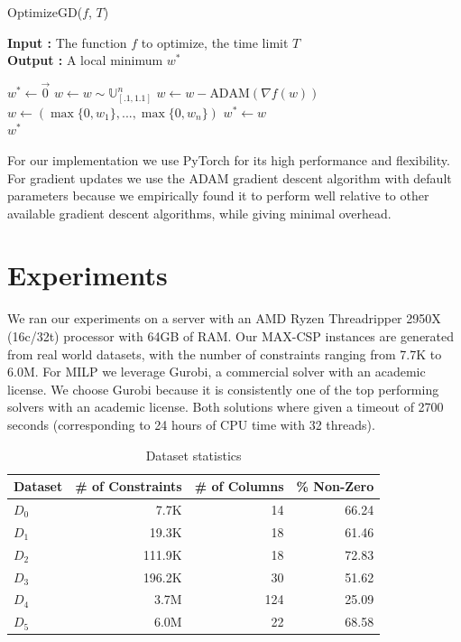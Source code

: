 \documentclass[a4paper]{article}
\begin{document}
\begin{algorithm}[H]
\caption{OptimizeGD($f$, $T$)}
\textbf{Input : } The function $f$ to optimize, the time limit $T$\\
\textbf{Output : } A local minimum $w^*$
\begin{algorithmic}[1]
	\State $w^* \gets \overrightarrow{0}$ 
		\State $w \gets w \sim \mathds{U}_{[.1,1.1]}^n$ 
				\State $w \gets w - \text{ADAM}(\nabla f(w))$ 
				\State $w \gets (\max\{0, w_1\},..., \max\{0, w_n\})$ 
			\EndFor
				\State $w^* \gets w$ 
			\EndIf
		\EndFor
	\EndWhile
	\\\Return $w^*$
\end{algorithmic}
\end{algorithm}

For our implementation we use PyTorch \cite{pytorch} for its high performance
and flexibility. For gradient updates we use the ADAM gradient descent algorithm with default parameters
\cite{ADAM_paper} because we empirically found it to perform well relative to
other available gradient descent algorithms, while giving minimal overhead. 

\section{Experiments}

We ran our experiments on a server with an AMD Ryzen Threadripper 2950X
(16c/32t) processor with 64GB of RAM. Our MAX-CSP instances are generated from
real world datasets, with the number of constraints ranging from 7.7K to 6.0M.
For MILP we leverage Gurobi, a commercial solver with an
academic license. We choose Gurobi because it is consistently one of the top
performing solvers \cite{benchmark} with an academic license. Both solutions where given a
timeout of 2700 seconds (corresponding to 24 hours of CPU time with 32 threads).

\begin{table}[ht!]
\caption{Dataset statistics}
\begin{tabular}{|l|r|r|r|}
\toprule
Dataset &  \# of Constraints &  \# of Columns &  \% Non-Zero \\
\midrule
         $D_0$ &                   7.7K &                 14 &         66.24 \\
         $D_1$ &                  19.3K &                 18 &         61.46 \\
         $D_2$ &                 111.9K &                 18 &         72.83 \\
         $D_3$ &                 196.2K &                 30 &         51.62 \\
         $D_4$ &                3.7M    &                124 &         25.09 \\
         $D_5$ &                6.0M    &                 22 &         68.58 \\
\bottomrule
\end{tabular}
\end{table}
\end{document}

